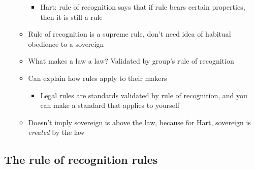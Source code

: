 \begin{itemize}
\begin{itemize}
    \begin{itemize}
    \tightlist
    \item
      Hart: rule of recognition says that if rule bears certain
      properties, then it is still a rule
    \end{itemize}
  \item
    Rule of recognition is a supreme rule, don't need idea of habitual
    obedience to a sovereign
  \item
    What makes a law a law? Validated by group's rule of recognition
  \item
    Can explain how rules apply to their makers

    \begin{itemize}
    \tightlist
    \item
      Legal rules are standards validated by rule of recognition, and
      you can make a standard that applies to yourself
    \end{itemize}
  \item
    Doesn't imply sovereign is above the law, because for Hart,
    sovereign is \emph{created} by the law
  \end{itemize}
\end{itemize}

\hypertarget{the-rule-of-recognition-rules}{%
\subsection{The rule of recognition
rules}\label{the-rule-of-recognition-rules}}

